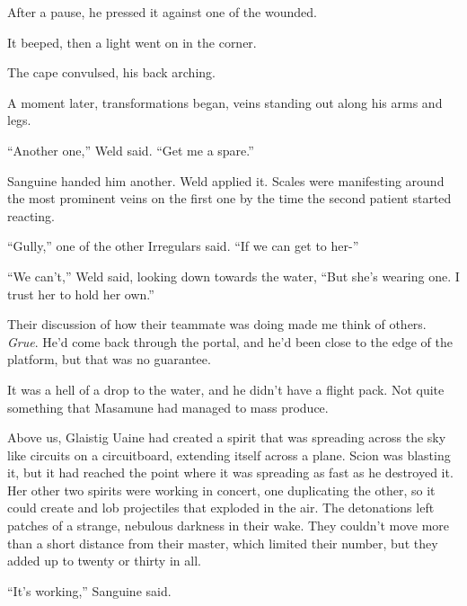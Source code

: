After a pause, he pressed it against one of the wounded.



It beeped, then a light went on in the corner.



The cape convulsed, his back arching.



A moment later, transformations began, veins standing out along his arms and legs.



``Another one,'' Weld said.  ``Get me a spare.''



Sanguine handed him another.  Weld applied it.  Scales were manifesting around the most prominent veins on the first one by the time the second patient started reacting.



``Gully,'' one of the other Irregulars said.  ``If we can get to her-''



``We can't,'' Weld said, looking down towards the water, ``But she's wearing one.  I trust her to hold her own.''



Their discussion of how their teammate was doing made me think of others.  \emph{Grue}.  He'd come back through the portal, and he'd been close to the edge of the platform, but that was no guarantee.



It was a hell of a drop to the water, and he didn't have a flight pack.  Not quite something that Masamune had managed to mass produce.



Above us, Glaistig Uaine had created a spirit that was spreading across the sky like circuits on a circuitboard, extending itself across a plane.  Scion was blasting it, but it had reached the point where it was spreading as fast as he destroyed it.  Her other two spirits were working in concert, one duplicating the other, so it could create and lob projectiles that exploded in the air.  The detonations left patches of a strange, nebulous darkness in their wake.  They couldn't move more than a short distance from their master, which limited their number, but they added up to twenty or thirty in all.



``It's working,'' Sanguine said.



